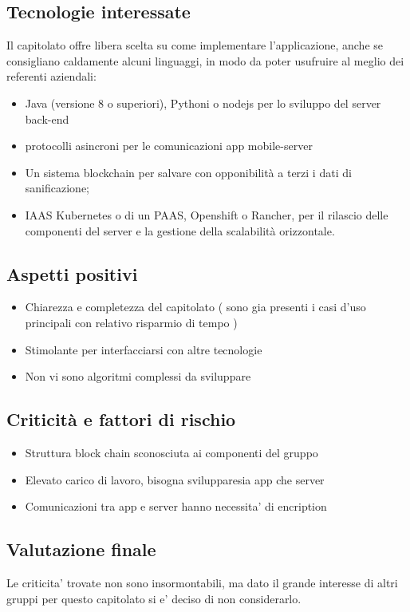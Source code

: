 \subsection{Tecnologie interessate}
Il capitolato offre libera scelta su come implementare l'applicazione, anche se consigliano caldamente alcuni linguaggi, in modo da poter usufruire al meglio dei referenti aziendali:
\begin{itemize}
\item Java (versione 8 o superiori), Pythoni o nodejs per lo sviluppo del server back-end
\item protocolli asincroni per le comunicazioni app mobile-server
\item Un sistema blockchain per salvare con opponibilità a terzi i dati di sanificazione;
\item IAAS Kubernetes o di un PAAS, Openshift o Rancher, per il rilascio delle componenti del server e la
gestione della scalabilità orizzontale.
\end{itemize}

\subsection{Aspetti positivi}
\begin{itemize}
\item Chiarezza e completezza del capitolato ( sono gia presenti i casi d'uso principali con relativo risparmio di tempo )
\item Stimolante per interfacciarsi con altre tecnologie 
\item Non vi sono algoritmi complessi da sviluppare
\end{itemize}

\subsection{Criticità e fattori di rischio}
\begin{itemize}
\item Struttura block chain sconosciuta ai componenti del gruppo 
\item Elevato carico di lavoro, bisogna svilupparesia app che server
\item Comunicazioni tra app e server hanno necessita' di encription
\end{itemize}

\subsection{Valutazione finale}
Le criticita' trovate non sono insormontabili, ma dato il grande interesse di altri gruppi per questo capitolato si e' deciso di non considerarlo.
